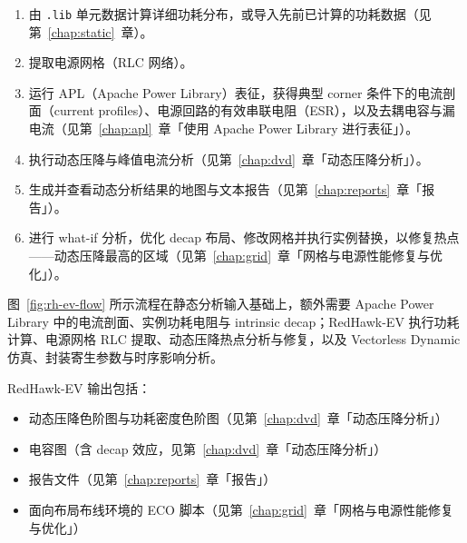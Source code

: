 \begin{enumerate}
\begin{itemize}
    \item SPICE model card 与库 subcircuit（表征 APL 电流波形所必需）
    \item 全部存储器、I/O 与 IP block 的 SPICE subcircuit（可选）
  \end{itemize}
  \item 由 \texttt{.lib} 单元数据计算详细功耗分布，或导入先前已计算的功耗数据（见第~\ref{chap:static}~章）。
  \item 提取电源网格（RLC 网络）。
  \item 运行 APL（Apache Power Library）表征，获得典型 corner 条件下的电流剖面（current profiles）、电源回路的有效串联电阻（ESR），以及去耦电容与漏电流（见第~\ref{chap:apl}~章「使用 Apache Power Library 进行表征」）。
  \item 执行动态压降与峰值电流分析（见第~\ref{chap:dvd}~章「动态压降分析」）。
  \item 生成并查看动态分析结果的地图与文本报告（见第~\ref{chap:reports}~章「报告」）。
  \item 进行 what-if 分析，优化 decap 布局、修改网格并执行实例替换，以修复热点——动态压降最高的区域（见第~\ref{chap:grid}~章「网格与电源性能修复与优化」）。
\end{enumerate}

图~\ref{fig:rh-ev-flow} 所示流程在静态分析输入基础上，额外需要 Apache Power Library 中的电流剖面、实例功耗电阻与 intrinsic decap；RedHawk-EV 执行功耗计算、电源网格 RLC 提取、动态压降热点分析与修复，以及 Vectorless Dynamic 仿真、封装寄生参数与时序影响分析。

RedHawk-EV 输出包括：
\begin{itemize}
  \item 动态压降色阶图与功耗密度色阶图（见第~\ref{chap:dvd}~章「动态压降分析」）
  \item 电容图（含 decap 效应，见第~\ref{chap:dvd}~章「动态压降分析」）
  \item 报告文件（见第~\ref{chap:reports}~章「报告」）
  \item 面向布局布线环境的 ECO 脚本（见第~\ref{chap:grid}~章「网格与电源性能修复与优化」）
\end{itemize}
